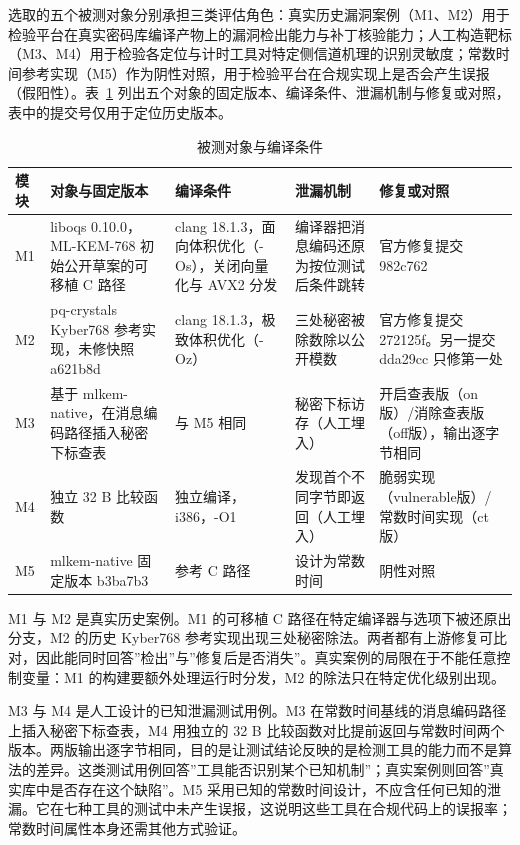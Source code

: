 选取的五个被测对象分别承担三类评估角色：真实历史漏洞案例（M1、M2）用于检验平台在真实密码库编译产物上的漏洞检出能力与补丁核验能力；人工构造靶标（M3、M4）用于检验各定位与计时工具对特定侧信道机理的识别灵敏度；常数时间参考实现（M5）作为阴性对照，用于检验平台在合规实现上是否会产生误报（假阳性）。表~\ref{tab:objects} 列出五个对象的固定版本、编译条件、泄漏机制与修复或对照，表中的提交号仅用于定位历史版本。

\begin{table}[H]
\centering
\caption{被测对象与编译条件}
\label{tab:objects}
{\small
\begin{tabularx}{\textwidth}{|>{\raggedright\arraybackslash}p{0.9cm}|>{\raggedright\arraybackslash}X|>{\raggedright\arraybackslash}p{3.4cm}|>{\raggedright\arraybackslash}p{4.2cm}|>{\raggedright\arraybackslash}p{3.3cm}|}
\hline
模块 & 对象与固定版本 & 编译条件 & 泄漏机制 & 修复或对照 \\
\hline
M1 & liboqs 0.10.0，ML-KEM-768 初始公开草案的可移植 C 路径 & clang 18.1.3，面向体积优化（-Os），关闭向量化与 AVX2 分发 & 编译器把消息编码还原为按位测试后条件跳转 & 官方修复提交 982c762 \\
\hline
M2 & pq-crystals Kyber768 参考实现，未修快照 a621b8d & clang 18.1.3，极致体积优化（-Oz） & 三处秘密被除数除以公开模数 & 官方修复提交 272125f。另一提交 dda29cc 只修第一处 \\
\hline
M3 & 基于 mlkem-native，在消息编码路径插入秘密下标查表 & 与 M5 相同 & 秘密下标访存（人工埋入） & 开启查表版（on版）/消除查表版（off版），输出逐字节相同 \\
\hline
M4 & 独立 32 B 比较函数 & 独立编译，i386，-O1 & 发现首个不同字节即返回（人工埋入） & 脆弱实现（vulnerable版）/常数时间实现（ct版） \\
\hline
M5 & mlkem-native 固定版本 b3ba7b3 & 参考 C 路径 & 设计为常数时间 & 阴性对照 \\
\hline
\end{tabularx}
}
\end{table}

M1 与 M2 是真实历史案例。M1 的可移植 C 路径在特定编译器与选项下被还原出分支，M2 的历史 Kyber768 参考实现出现三处秘密除法\cite{kyber2018}。两者都有上游修复可比对，因此能同时回答”检出”与”修复后是否消失”。真实案例的局限在于不能任意控制变量：M1 的构建要额外处理运行时分发，M2 的除法只在特定优化级别出现。

M3 与 M4 是人工设计的已知泄漏测试用例。M3 在常数时间基线的消息编码路径上插入秘密下标查表，M4 用独立的 32 B 比较函数对比提前返回与常数时间两个版本。两版输出逐字节相同，目的是让测试结论反映的是检测工具的能力而不是算法的差异。这类测试用例回答”工具能否识别某个已知机制”；真实案例则回答”真实库中是否存在这个缺陷”。M5 采用已知的常数时间设计，不应含任何已知的泄漏。它在七种工具的测试中未产生误报，这说明这些工具在合规代码上的误报率；常数时间属性本身还需其他方式验证。

